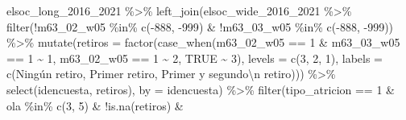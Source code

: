 \documentclass[
  12pt,
]{book}
\newenvironment{Shaded}{\begin{snugshade}}{\end{snugshade}}
\newcommand{\AttributeTok}[1]{\textcolor[rgb]{0.77,0.63,0.00}{#1}}
\newcommand{\ConstantTok}[1]{\textcolor[rgb]{0.00,0.00,0.00}{#1}}
\newcommand{\DecValTok}[1]{\textcolor[rgb]{0.00,0.00,0.81}{#1}}
\newcommand{\FunctionTok}[1]{\textcolor[rgb]{0.00,0.00,0.00}{#1}}
\newcommand{\NormalTok}[1]{#1}
\newcommand{\SpecialCharTok}[1]{\textcolor[rgb]{0.00,0.00,0.00}{#1}}
\newcommand{\StringTok}[1]{\textcolor[rgb]{0.31,0.60,0.02}{#1}}
\begin{document}
\begin{Shaded}
\begin{Highlighting}[]
\NormalTok{elsoc\_long\_2016\_2021 }\SpecialCharTok{\%\textgreater{}\%} 
  \FunctionTok{left\_join}\NormalTok{(elsoc\_wide\_2016\_2021 }\SpecialCharTok{\%\textgreater{}\%} 
              \FunctionTok{filter}\NormalTok{(}\SpecialCharTok{!}\NormalTok{m63\_02\_w05 }\SpecialCharTok{\%in\%} \FunctionTok{c}\NormalTok{(}\SpecialCharTok{{-}}\DecValTok{888}\NormalTok{, }\SpecialCharTok{{-}}\DecValTok{999}\NormalTok{) }\SpecialCharTok{\&} \SpecialCharTok{!}\NormalTok{m63\_03\_w05 }\SpecialCharTok{\%in\%} \FunctionTok{c}\NormalTok{(}\SpecialCharTok{{-}}\DecValTok{888}\NormalTok{, }\SpecialCharTok{{-}}\DecValTok{999}\NormalTok{)) }\SpecialCharTok{\%\textgreater{}\%}
              \FunctionTok{mutate}\NormalTok{(}\AttributeTok{retiros =} \FunctionTok{factor}\NormalTok{(}\FunctionTok{case\_when}\NormalTok{(m63\_02\_w05 }\SpecialCharTok{==} \DecValTok{1} \SpecialCharTok{\&}\NormalTok{ m63\_03\_w05 }\SpecialCharTok{==} \DecValTok{1} \SpecialCharTok{\textasciitilde{}} \DecValTok{1}\NormalTok{,}
\NormalTok{                                                m63\_02\_w05 }\SpecialCharTok{==} \DecValTok{1} \SpecialCharTok{\textasciitilde{}} \DecValTok{2}\NormalTok{,}
                                                \ConstantTok{TRUE} \SpecialCharTok{\textasciitilde{}} \DecValTok{3}\NormalTok{),}
                                      \AttributeTok{levels =} \FunctionTok{c}\NormalTok{(}\DecValTok{3}\NormalTok{, }\DecValTok{2}\NormalTok{, }\DecValTok{1}\NormalTok{),}
                                      \AttributeTok{labels =} \FunctionTok{c}\NormalTok{(}\StringTok{\textquotesingle{}Ningún retiro\textquotesingle{}}\NormalTok{, }
                                                 \StringTok{\textquotesingle{}Primer retiro\textquotesingle{}}\NormalTok{, }
                                                 \StringTok{\textquotesingle{}Primer y segundo}\SpecialCharTok{\textbackslash{}n}\StringTok{ retiro\textquotesingle{}}\NormalTok{))) }\SpecialCharTok{\%\textgreater{}\%}
              \FunctionTok{select}\NormalTok{(idencuesta, retiros), }\AttributeTok{by =} \StringTok{\textquotesingle{}idencuesta\textquotesingle{}}\NormalTok{) }\SpecialCharTok{\%\textgreater{}\%} 
  \FunctionTok{filter}\NormalTok{(tipo\_atricion }\SpecialCharTok{==} \DecValTok{1} \SpecialCharTok{\&}\NormalTok{ ola }\SpecialCharTok{\%in\%} \FunctionTok{c}\NormalTok{(}\DecValTok{3}\NormalTok{, }\DecValTok{5}\NormalTok{) }\SpecialCharTok{\&} \SpecialCharTok{!}\FunctionTok{is.na}\NormalTok{(retiros) }\SpecialCharTok{\&}

\end{Highlighting}
\end{Shaded}
\end{document}
